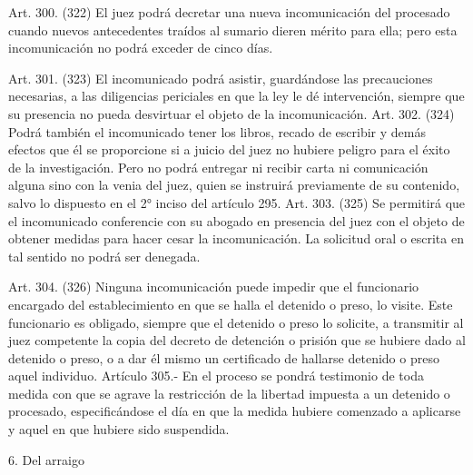     Art. 300. (322) El juez podrá decretar una nueva incomunicación del procesado cuando nuevos antecedentes traídos al sumario dieren mérito para ella; pero esta incomunicación no podrá exceder de cinco días.

    Art. 301. (323) El incomunicado podrá asistir, guardándose las precauciones necesarias, a las diligencias periciales en que la ley le dé intervención, siempre que su presencia no pueda desvirtuar el objeto de la incomunicación.
    Art. 302. (324) Podrá también el incomunicado tener los libros, recado de escribir y demás efectos que él se proporcione si a juicio del juez no hubiere peligro para el éxito de la investigación.
    Pero no podrá entregar ni recibir carta ni comunicación alguna sino con la venia del juez, quien se instruirá previamente de su contenido, salvo lo dispuesto en el 2° inciso del artículo 295.
    Art. 303. (325) Se permitirá que el incomunicado conferencie con su abogado en presencia del juez con el objeto de obtener medidas para hacer cesar la incomunicación. La solicitud oral o escrita en tal sentido no podrá ser denegada.

    Art. 304. (326) Ninguna incomunicación puede impedir que el funcionario encargado del establecimiento en que se halla el detenido o preso, lo visite.
    Este funcionario es obligado, siempre que el detenido o preso lo solicite, a transmitir al juez competente la copia del decreto de detención o prisión que se hubiere dado al detenido o preso, o a dar él mismo un certificado de hallarse detenido o preso aquel individuo.
    Artículo 305.- En el proceso se pondrá testimonio de toda medida con que se agrave la restricción de la libertad impuesta a un detenido o procesado, especificándose el día en que la medida hubiere comenzado a aplicarse y aquel en que hubiere sido suspendida.

  6. Del arraigo


